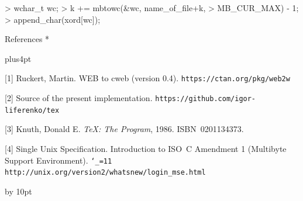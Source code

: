 > { wchar_t wc;
>   k += mbtowc(&wc, name_of_file+k,
>               MB_CUR_MAX) - 1;
>   append_char(xord[wc]); }
\endverbatim

\head * References *

\begingroup
\vskip-1pt

\frenchspacing
\parindent=0pt
\parskip=4pt plus4pt
\def\\{\hfil\break}
\everypar{\hangindent=1.5em\relax}
\raggedright

[1] Ruckert, Martin. WEB to cweb (version 0.4).\\
{\tt https://ctan.org/pkg/web2w}

[2] Source of the present implementation.\\
{\tt https://github.com/igor-liferenko/tex}

[3] Knuth, Donald E. {\sl \TeX: The Program\/}, 1986. ISBN~0201134373.

[4] Single Unix Specification. Introduction to ISO~C Amendment 1
(Multibyte Support Environment).\\
{\tt\catcode`_=11 http://unix.org/version2/whatsnew/\\login_mse.html}

\par\endgroup

\advance\signaturewidth by 10pt
\makesignature
\endarticle
